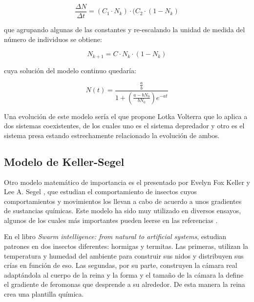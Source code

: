 \begin{equation}
    \displaystyle{\frac{\Delta N}{\Delta t} = (C_1 \cdot N_k) \cdot (C_2 \cdot (1-N_k)}
\end{equation}

\noindent que agrupando algunas de las constantes y re-escalando la unidad de medida del número de individuos se obtiene:

\begin{equation}
    N_{k+1} = C \cdot N_k \cdot (1 - N_k)
\end{equation}

\noindent cuya solución del modelo continuo quedaría:

\begin{equation}
    \displaystyle{N(t) = \frac{\frac{a}{b}}{1+(\frac{a-bN_0}{bN_0})e^{-at}}} 
\end{equation}

Una evolución de este modelo sería el que propone Lotka Volterra \cite[Cap.~43]{haberman1998mathematical} que lo aplica a dos sistemas coexistentes, de los cuales uno es el sistema depredador y otro es el sistema presa estando estrechamente relacionado la evolución de ambos.


\subsection{Modelo de Keller-Segel} \label{s_2_2_2}
Otro modelo matemático de importancia es el presentado por Evelyn Fox Keller y Lee A. Segel \cite{keller1970initiation, keller1971model, keller1971traveling}, que estudian el comportamiento de insectos cuyos comportamientos y movimientos los llevan a cabo de acuerdo a unos gradientes de sustancias químicas. Este modelo ha sido muy utilizado en diversos ensayos, algunos de los cuales más importantes pueden leerse en las referencias \cite{calvez2008parabolic, blanchet2008convergence, calvez2006volume, dolbeault2004optimal, blanchet2006two, corrias2006critical}.

En el libro \textit{Swarm intelligence: from natural to artificial systems}, \citeauthor{bonabeau1999swarm} estudian patrones en dos insectos diferentes: hormigas y termitas. Las primeras, utilizan la temperatura y humedad del ambiente para construir sus nidos y distribuyen sus crías en función de eso. Las segundas, por su parte, construyen la cámara real adaptándola al cuerpo de la reina y la forma y el tamaño de la cámara la define el gradiente de feromonas que desprende a su alrededor. De esta manera la reina crea una plantilla química.

